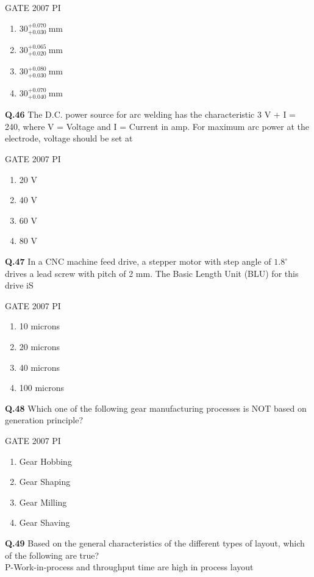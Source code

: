 \documentclass[journal,12pt,onecolumn]{exam}
\theoremstyle{remark}
\begin{document}
 \hfill{GATE 2007 PI}
\begin{enumerate}
    \item $30^{+0.070}_{+0.030} \ \text{mm}$
    \item $30^{+0.065}_{+0.020} \ \text{mm}$
    \item $30^{+0.080}_{+0.030} \ \text{mm}$
    \item $30^{+0.070}_{+0.040} \ \text{mm}$
\end{enumerate}
\noindent
\textbf{Q.46}
The D.C. power source for arc welding has the characteristic 3 V + I = 240, where V = Voltage and I = Current in amp. For maximum arc power at the electrode, voltage should be set at

\hfill{GATE 2007 PI}
\begin{enumerate}
    \item 20 V
    \item 40 V
    \item 60 V
    \item 80 V
    
\end{enumerate}
\noindent
\textbf{Q.47}
	In a CNC machine feed drive, a stepper motor with step angle of  $1.8^\circ$
 drives a lead screw with pitch of 2 mm. The Basic Length Unit (BLU) for this drive iS
 
 \hfill{GATE 2007 PI}
 \begin{enumerate}
     \item 10 microns
     \item 20 microns
     \item 40 microns
     \item 100 microns
 \end{enumerate}
 \noindent
 \textbf{Q.48}
 Which one of the following gear manufacturing processes is NOT based on generation principle?
 
 \hfill{GATE 2007 PI}
 \begin{enumerate}
     \item Gear Hobbing
     \item Gear Shaping
     \item Gear Milling
     \item Gear Shaving
 \end{enumerate} 
\noindent
\textbf{Q.49}
Based on the general characteristics of the different types of layout, which of the following are true?\\

P-Work-in-process and throughput time are high in process layout\\
\end{document}
